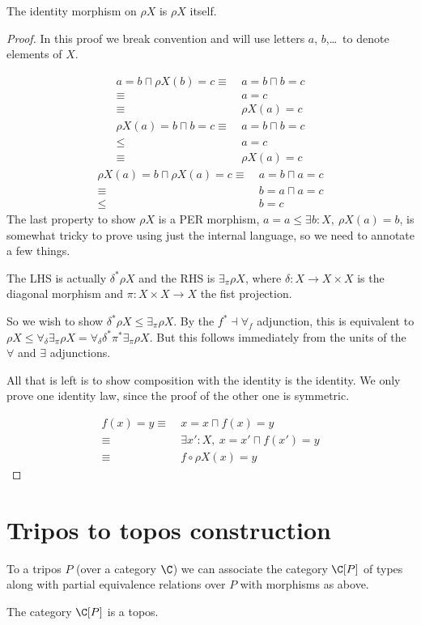 \begin{construction}
    The identity morphism on \(ρX\) is \(ρX\) itself.
\end{construction}
\begin{proof}
    In this proof we break convention and will use letters \(a\), \(b\),…\ to denote elements of \(X\).

    \begin{align*}
        a = b ⊓ ρX(b) = c
        ≡\ & a = b ⊓ b = c\\
        ≡\ & a = c\\
        ≡\ & ρX(a) = c
    \end{align*}
    \begin{align*}
        ρX(a) = b ⊓ b = c
        ≡\ & a = b ⊓ b = c\\
        ≤\ & a = c\\
        ≡\ & ρX(a) = c
    \end{align*}
    \begin{align*}
        ρX(a) = b ⊓ ρX(a) = c
        ≡\ & a = b ⊓ a = c\\
        ≡\ & b = a ⊓ a = c\\
        ≤\ & b = c
    \end{align*}
    The last property to show \(ρX\) is a PER morphism, \(a = a ≤ ∃ b : X,\ ρX(a) = b\), is somewhat tricky to prove using just the internal language, so we need to annotate a few things.

    The LHS is actually \(δ^*ρX\) and the RHS is \(∃_π ρX\), where \(δ : X → X×X\) is the diagonal morphism and \(π : X×X → X\) the fist projection.

    So we wish to show \(δ^*ρX ≤ ∃_π ρX\). By the \(f^* \dashv ∀_f\) adjunction, this is equivalent to \(ρX ≤ ∀_δ ∃_π ρX = ∀_δ δ^* π^* ∃_π ρX\).
    But this follows immediately from the units of the \(∀\) and \(∃\) adjunctions.

    All that is left is to show composition with the identity is the identity. We only prove one identity law, since the proof of the other one is symmetric.

    \begin{align*}
        f(x) = y 
        ≡\ & x = x ⊓ f(x) = y\\ 
        ≡\ & ∃ x' : X,\ x = x' ⊓ f(x') = y\\ 
        ≡\ & f∘ρX(x) = y
    \end{align*}
\end{proof}

\section{Tripos to topos construction}

\begin{definition}
    To a tripos \(P\) (over a category \(\C\)) we can associate the category \(\C[P]\) of types along with partial equivalence relations over \(P\) with morphisms as above.
\end{definition}

\begin{theorem}[Pitts]
    The category \(\C[P]\) is a topos.
\end{theorem}
